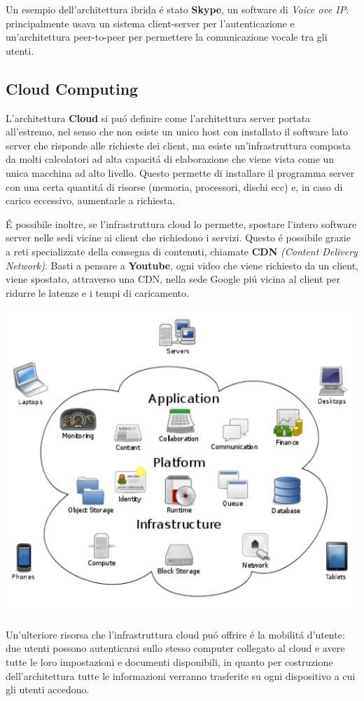 \documentclass[12pt]{article}
\begin{document}
Un esempio dell'architettura ibrida \'e stato \textbf{Skype}, un software di \textit{Voice ove IP}: principalmente usava un 
sistema client-server per l'autenticazione e un'architettura peer-to-peer per permettere la comunicazione vocale tra gli utenti.

\clearpage
\subsection{Cloud Computing}\label{cloud-computing}
L'architettura \textbf{Cloud} si pu\'o definire come l'architettura server portata all'estremo, nel senso che non esiste un 
unico host con installato il software lato server che risponde alle richieste dei client, ma esiste un'infrastruttura composta da 
molti calcolatori ad alta capacit\'a di elaborazione che viene vista come un unica macchina ad alto livello. Questo permette di 
installare il programma server con una certa quantit\'a di risorse (memoria, processori, dischi ecc) e, in caso di carico eccessivo, 
aumentarle a richiesta.

\'E possibile inoltre, se l'infrastruttura cloud lo permette, spostare l'intero software server nelle sedi vicine ai client che
richiedono i servizi. Questo \'e possibile grazie a reti specializzate della consegna di contenuti, chiamate \textbf{CDN} 
\textit{(Content Delivery Network)}. Basti a pensare a \textbf{Youtube}, ogni video che viene richiesto da un client, viene 
spostato, attraverso una CDN, nella sede Google pi\'u vicina al client per ridurre le latenze e i tempi di caricamento.
\begin{center}
	\includegraphics[scale=0.5]{applicazione-img3.png}
\end{center}
Un'ulteriore risorsa che l'infrastruttura cloud pu\'o offrire \'e la mobilit\'a d'utente: due utenti possono autenticarsi sullo 
stesso computer collegato al cloud e avere tutte le loro impostazioni e documenti disponibili, in quanto per costruzione 
dell'architettura tutte le informazioni verranno trasferite su ogni dispositivo a cui gli utenti accedono.
\end{document}
